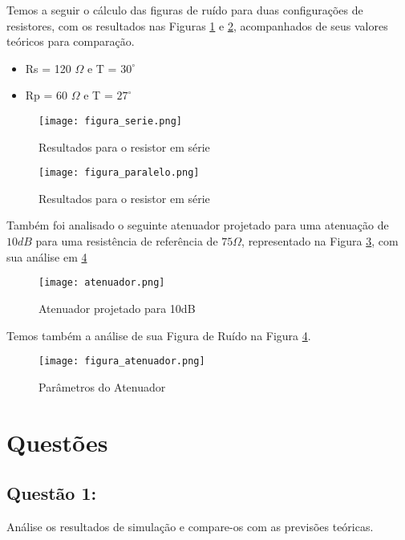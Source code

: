 \documentclass[a4paper,12pt]{proc}
\begin{document}
\noindent Temos a seguir o cálculo das figuras de ruído para duas configurações de resistores, com os resultados nas Figuras \ref{figura_serie} e \ref{figura_paralelo}, acompanhados de seus valores teóricos para comparação.

\begin{itemize}
    \item Rs = 120 $\Omega$ e T = $30^{\circ}$
    \item Rp = 60 $\Omega$ e T = $27^{\circ}$
\end{itemize}

\begin{figure}[htbp]
    \centering
    \texttt{[image: figura\_serie.png]}
    \caption{Resultados para o resistor em série}
    \label{figura_serie}
\end{figure}

\begin{figure}[htbp]
    \centering
    \texttt{[image: figura\_paralelo.png]}
    \caption{Resultados para o resistor em série}
    \label{figura_paralelo}
\end{figure}

\noindent Também foi analisado o seguinte atenuador projetado para uma atenuação de $10dB$ para uma resistência de referência de $75\Omega$, representado na Figura \ref{atenuador}, com sua análise em \ref{figura_atenuador}

\begin{figure}[htbp]
    \centering
    \texttt{[image: atenuador.png]}
    \caption{Atenuador projetado para 10dB}
    \label{atenuador}
\end{figure}

\noindent Temos também a análise de sua Figura de Ruído na Figura \ref{figura_atenuador}.

\begin{figure}[htbp]
    \centering
    \texttt{[image: figura\_atenuador.png]}
    \caption{Parâmetros do Atenuador}
    \label{figura_atenuador}
\end{figure}

\section{Questões}

\subsection{Questão 1:}
Análise os resultados de simulação e compare-os com as previsões teóricas.
\singlespacing
\end{document}
